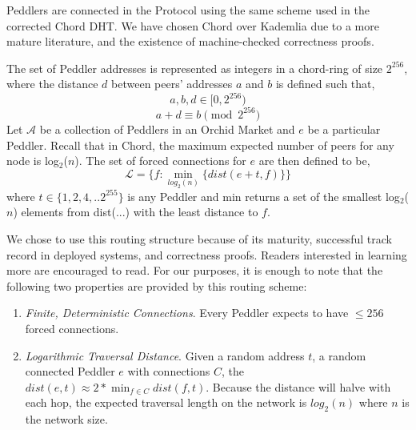 


Peddlers are connected in the \Orchid{} Protocol using the same scheme used in the corrected Chord DHT. We have chosen Chord over Kademlia due to a more mature literature, and the existence of machine-checked correctness proofs\cite{ChordCorrect}.

The set of Peddler addresses is represented as integers in a chord-ring of size $2^{256}$, where the distance $d$ between peers' addresses $a$ and $b$ is defined such that,
						$$a, b, d \in [0, 2^{256})$$ 
                        $$a + d \equiv b \pmod{2^{256}}$$
Let $\mathcal{A}$ be a collection of Peddlers in an Orchid Market and $e$ be a particular Peddler. 
Recall that in Chord, the maximum expected number of peers for any node is log$_2$($n$). The set of forced connections for $e$ are then defined to be,
						$$\mathcal{L} = \{f : \min_{log_2(n)} \{dist(e+t, f)\}\}$$ 
where $t \in \{1, 2, 4,.. 2^{255}\}$ is any Peddler and min returns a set of the smallest log$_2$($n$) elements from dist(...) with the least distance to $f$.

We chose to use this routing structure because of its maturity, successful track record in deployed systems, and correctness proofs. Readers interested in learning more are encouraged to read\cite{CHORD}. For our purposes, it is enough to note that the
following two properties are provided by this routing scheme:

\begin{enumerate}
\item \emph{Finite, Deterministic Connections}. Every Peddler expects to have $\leq 256$ forced connections.
\item \emph{Logarithmic Traversal Distance}. Given a random address $t$, a random connected Peddler $e$ with connections $C$, the $dist(e, t) \approx 2 * \min_{f \in C} dist(f, t)$. Because the distance will halve with each hop, the expected traversal length on the network is $log_2(n)$ where $n$ is the network size.
\end{enumerate}

